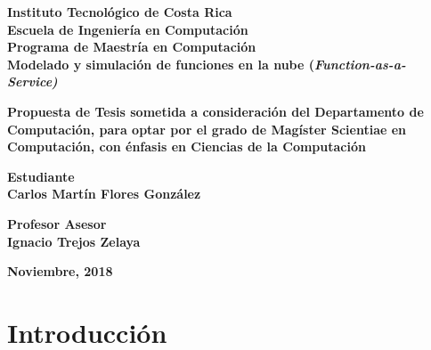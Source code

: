 \documentclass[12pt, twoside]{report}
\begin{document}
\thispagestyle{plain}
\begin{titlepage}
	\begin{center}
        {\fontsize{24}{28}\selectfont \textbf{Instituto Tecnológico de Costa Rica}\\}
        \vspace{1cm}
        {\fontsize{20}{24}\selectfont \textbf{Escuela de Ingeniería en Computación}\\}
        {\fontsize{18}{22}\selectfont \textbf{Programa de Maestría en Computación}\\}
        \vspace{2cm}
        {\fontsize{20}{24}\selectfont \textbf{Modelado y simulación de funciones en la nube (\textit{Function-as-a-Service)}}}    
    
    
        \vspace{2cm}
        {\fontsize{14}{17}\selectfont \textbf{Propuesta de Tesis sometida a consideración del Departamento de Computación, para optar por el grado de Magíster Scientiae en Computación, con énfasis en Ciencias de la Computación
}}
        
       \vspace{1.5cm}
       {\fontsize{14}{17}\selectfont \textbf{Estudiante\\ Carlos Martín Flores González}} 
       
       \vspace{1cm}
       {\fontsize{14}{17}\selectfont \textbf{Profesor Asesor\\ Ignacio Trejos Zelaya}}
       
       \vspace{1.5cm}
       {\fontsize{14}{17}\selectfont \textbf{Noviembre, 2018}}                       
        
    \end{center}
\end{titlepage}

{} 
\renewcommand*\contentsname{Indice}
\tableofcontents
\listoffigures
\listoftables

\chapter{Introducción}

\end{document}
